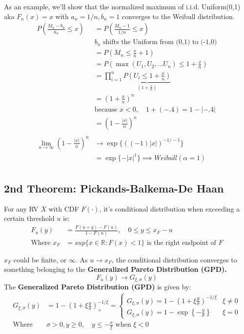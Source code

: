 \documentclass[
  oneside]{book}
\begin{document}
As an example, we'll show that the normalized maximum of i.i.d. Uniform(0,1) aka \(F_{n}(x) = x\) with \(a_{n}=1/n, b_{n}=1\) converges to the Weibull distribution.
\[
\begin{aligned}
P\left( \frac{M_{n}-b_{n}}{a_{n}} \leq x\right) &= P\left( \frac{M_{n}-1}{1/n} \leq x\right)\\
& b_{n}\text{ shifts the Uniform from (0,1) to (-1,0)}\\
&= P\left( M_{n} \leq \frac{x}{n}+1 \right)\\
&= P\left( \max(U_{1}, U_{2}, \dots U_{n}) \leq 1+\frac{x}{n} \right)\\
&= \prod^{n}_{i=1} \underbrace{ P\left( U_{i}\leq 1+\frac{x}{n} \right) }_{ \left( 1+\frac{x}{n} \right) }\\
&= \left( 1+\frac{x}{n} \right)^{n}\\
& \text{because } x<0, \quad 1+ (-.4) = 1-|-.4|\\
&=\left( 1-\frac{|x|}{n} \right)^{n}\\
\\
\lim_{ n \to \infty } \left( 1-\frac{|x|}{n} \right)^{n} &\to \exp\{((-1)|x|)^{-1/-1}\}\\
&= \exp\{-|x|^{1}\} \implies Weibull(\alpha=1)\\
\end{aligned}
\]

\hypertarget{nd-theorem-pickands-balkema-de-haan}{%
\subsection{2nd Theorem: Pickands-Balkema-De Haan}\label{nd-theorem-pickands-balkema-de-haan}}

For any RV \(X\) with CDF \(F(\cdot)\), it's conditional distribution when exceeding a certain threshold \(u\) is:
\[
\begin{aligned}
F_{u}(y) &= \frac{F(u+y)-F(u)}{1-F(u)}, \quad 0\leq y\leq x_{F}-u\\
\text{Where } x_{F} &= sup\{x \in \mathbb{R}:F(x) < 1\} \text{ is the right endpoint of } F
\end{aligned}
\]

\(x_{F}\) could be finite, or \(\infty\). As \(u\to x_{F}\), the conditional distribution converges to something belonging to the \textbf{Generalized Pareto Distribution (GPD).}
\[
F_{u}(y) \to G_{\xi, \sigma}(y)
\]
The \textbf{Generalized Pareto Distribution (GPD)} is given by:
\[
\begin{aligned}
G_{\xi,\sigma}(y) &= 1 - \left( 1+\xi \frac{y}{\sigma} \right)^{-1/\xi}_{+} = \begin{cases}
G_{\xi, \sigma}(y) = 1-\left( 1+\xi  \frac{y}{\sigma} \right)^{-1/\xi}  & \xi \ne 0\\
G_{\xi, \sigma}(y) = 1-\exp\left\{ -\frac{y}{\sigma} \right\}  & \xi = 0
\end{cases}\\
\text{Where } & \sigma > 0, y\geq 0, \quad y\leq-\frac{\sigma}{\xi} \text{ when } \xi < 0
\end{aligned}
\]
\end{document}
